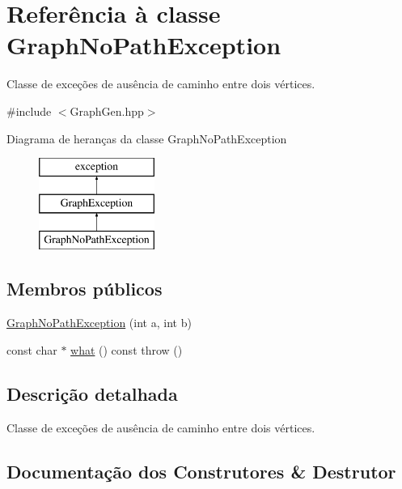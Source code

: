 \hypertarget{classGraphNoPathException}{}\section{Referência à classe Graph\+No\+Path\+Exception}
\label{classGraphNoPathException}


Classe de exceções de ausência de caminho entre dois vértices.  




{\ttfamily \#include $<$Graph\+Gen.\+hpp$>$}

Diagrama de heranças da classe Graph\+No\+Path\+Exception\begin{figure}[H]
\begin{center}
\leavevmode
\includegraphics[height=3.000000cm]{classGraphNoPathException}
\end{center}
\end{figure}
\subsection*{Membros públicos}
\begin{DoxyCompactItemize}
\item 
\mbox{\hyperlink{classGraphNoPathException_a1d9dd40f194e7705b8009cd2a4ed7f79}{Graph\+No\+Path\+Exception}} (int a, int b)
\item 
const char $\ast$ \mbox{\hyperlink{classGraphNoPathException_a33d7ba709a76ad03175a929e8313221c}{what}} () const  throw ()
\end{DoxyCompactItemize}


\subsection{Descrição detalhada}
Classe de exceções de ausência de caminho entre dois vértices. 

\subsection{Documentação dos Construtores \& Destrutor}
\mbox{\label{classGraphNoPathException_a1d9dd40f194e7705b8009cd2a4ed7f79}} 
